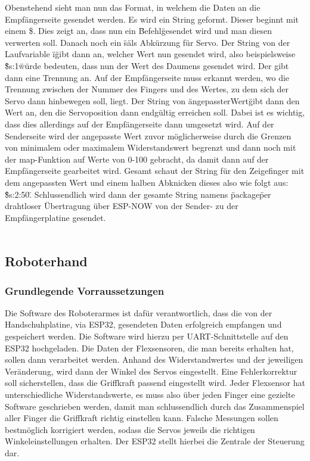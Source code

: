 \documentclass[titlepage,12pt,twoside]{article}
\begin{document}
\hfill \break
Obenstehend sieht man nun das Format, in welchem die Daten an die Empfängerseite 
gesendet werden. Es wird ein String geformt. Dieser beginnt mit einem \$. Dies zeigt 
an, dass nun ein \"Befehl\" gesendet wird und man diesen verwerten soll. Danach noch 
ein \"s\" als Abkürzung für Servo. Der String von der Laufvariable \"i\" gibt dann an, 
welcher Wert nun gesendet wird, also beispielsweise \"\$s:1\" würde bedeuten, dass nun 
der Wert des Daumens gesendet wird. Der gibt dann eine Trennung an. Auf der 
Empfängerseite muss erkannt werden, wo die Trennung zwischen der Nummer des Fingers 
und des Wertes, zu dem sich der Servo dann hinbewegen soll, liegt. Der String von 
\"angepassterWert\" gibt dann den Wert an, den die Servoposition dann endgültig 
erreichen soll. Dabei ist es wichtig, dass dies allerdings auf der Empfängerseite 
dann umgesetzt wird. Auf der Senderseite wird der angepasste Wert zuvor 
möglicherweise durch die Grenzen von minimalem oder maximalem Widerstandswert 
begrenzt und dann noch mit der map-Funktion auf Werte von 0-100 gebracht, da damit 
dann auf der Empfängerseite gearbeitet wird. Gesamt schaut der String für den 
Zeigefinger mit dem angepassten Wert und einem halben Abknicken dieses also wie 
folgt aus: \"\$s:2:50\". Schlussendlich wird dann der gesamte String namens 
\"package\" per drahtloser Übertragung über ESP-NOW von der Sender- zu der 
Empfängerplatine gesendet. \\
\\

\newpage
\subsection{Roboterhand}

\subsubsection{Grundlegende Vorraussetzungen}
Die Software des Roboterarmes ist dafür verantwortlich, dass die von der Handschuhplatine, via ESP32, gesendeten Daten 
erfolgreich empfangen und gespeichert werden. Die Software wird hierzu per UART-Schnittstelle auf den ESP32 hochgeladen. 
Die Daten der Flexsensoren, die man bereits erhalten hat, sollen dann verarbeitet werden. Anhand des Widerstandwertes und 
der jeweiligen Veränderung, wird dann der Winkel des Servos eingestellt. Eine Fehlerkorrektur soll sicherstellen, dass die 
Griffkraft passend eingestellt wird. Jeder Flexsensor hat unterschiedliche Widerstandswerte, es muss also über jeden Finger 
eine gezielte Software geschrieben werden, damit man schlussendlich durch das Zusammenspiel aller Finger die Griffkraft 
richtig einstellen kann. Falsche Messungen sollen bestmöglich korrigiert werden, sodass die Servos jeweils die richtigen 
Winkeleinstellungen erhalten. Der ESP32 stellt hierbei die Zentrale der Steuerung dar.
\end{document}
